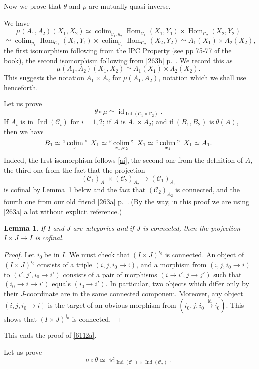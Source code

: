 \documentclass[12pt]{article}%
\newtheorem{lem}[thm]{Lemma}
\theoremstyle{remark}
\theoremstyle{definition}
\newcommand{\C}{\mathcal C}
\newcommand{\xr}{\xrightarrow}
\DeclareMathOperator*{\colim}{colim}
\DeclareMathOperator*{\ic}{``\colim"}
\DeclareMathOperator{\id}{id}
\DeclareMathOperator{\Hom}{Hom}%
\DeclareMathOperator{\Ind}{Ind}
\begin{document}
Now we prove that $\theta$ and $\mu$ are mutually quasi-inverse.

We have 
$$
\mu(A_1,A_2)(X_1,X_2)\simeq\colim_{y_1,y_2}\Hom_{\C_1}(X_1,Y_1)\times\Hom_{\C_2}(X_2,Y_2)
$$
$$
\simeq\colim_{y_1}\Hom_{\C_1}(X_1,Y_1)\times\colim_{y_2}\Hom_{\C_2}(X_2,Y_2)\simeq A_1(X_1)\times A_2(X_2),
$$ 
the first isomorphism following from the IPC Property (see pp 75-77 of the book), the second isomorphism following from \eqref{263b} p.~\pageref{263b}. We record this as
$$
\mu(A_1,A_2)(X_1,X_2)\simeq A_1(X_1)\times A_2(X_2).
$$
This suggests the notation $A_1\times A_2$ for $\mu(A_1,A_2)$, notation which we shall use henceforth.

Let us prove
%
\begin{equation}\label{6112a}
\theta\circ\mu\simeq\id_{\Ind(\C_1\times\C_2)}.
\end{equation}
%
If $A_i$ is in $\Ind(\C_i)$ for $i=1,2$; if $A$ is $A_1\times A_2$; and if $(B_1,B_2)$ is $\theta(A)$, then we have 
$$ 
B_1\simeq\ic_x\ X_1\simeq\ic_{x_1,x_2}\ X_1\simeq\ic_{x_1}\ X_1\simeq A_1.
$$ 
Indeed, the first isomorphism follows \eqref{ai}, the second one from the definition of $A$, the third one from the fact that the projection 
$$
(\C_1)_{A_1}\times(\C_2)_{A_2}\to(\C_1)_{A_1}
$$ 
is cofinal by Lemma~\ref{proj} below and the fact that $(\C_2)_{A_2}$ is connected, and the fourth one from our old friend \eqref{263a} p.~\pageref{263a}. (By the way, in this proof we are using \eqref{263a} a lot without explicit reference.)
%
\begin{lem}\label{proj}
If $I$ and $J$ are categories and if $J$ is connected, then the projection $I\times J\to I$ is cofinal.
\end{lem}
%
\begin{proof}
Let $i_0$ be in $I$. We must check that $(I\times J)^{i_0}$ is connected. An object of $(I\times J)^{i_0}$ consists of a triple $(i,j,i_0\to i)$, and a morphism from $(i,j,i_0\to i)$ to $(i',j',i_0\to i')$ consists of a pair of morphisms $(i\to i',j\to j')$ such that $(i_0\to i\to i')$ equals $(i_0\to i')$. In particular, two objects which differ only by their $J$-coordinate are in the same connected component. Moreover, any object $(i,j,i_0\to i)$ is the target of an obvious morphism from $(i_0,j,i_0\xr{\id}i_0)$. This shows that $(I\times J)^{i_0}$ is connected.
\end{proof}

This ends the proof of \eqref{6112a}.

Let us prove
%
\begin{equation}\label{6112b}
\mu\circ\theta\simeq\id_{\Ind(\C_1)\times\Ind(\C_2)}.
\end{equation}
\end{document}
